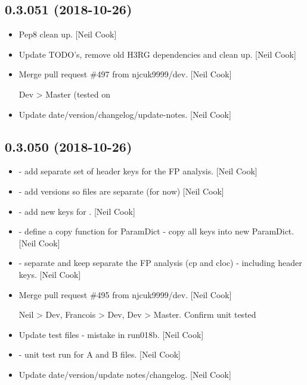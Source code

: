 \documentclass[a4paper,10pt,english]{report}
\begin{document}
\subsection{0.3.051 (2018-10-26)}
\label{\detokenize{misc/changelog:id281}}\begin{itemize}
\item {} 
Pep8 clean up. {[}Neil Cook{]}

\item {} 
Update TODO’s, remove old H3RG dependencies and clean up. {[}Neil Cook{]}

\item {} 
Merge pull request \#497 from njcuk9999/dev. {[}Neil Cook{]}

Dev \textendash{}\textgreater{} Master (tested on 

\item {} 
Update date/version/changelog/update-notes. {[}Neil Cook{]}

\end{itemize}


\subsection{0.3.050 (2018-10-26)}
\label{\detokenize{misc/changelog:id282}}\begin{itemize}
\item {} 
 - add separate set of header keys for the FP
analysis. {[}Neil Cook{]}

\item {} 
 - add  versions so files are separate (for now)
{[}Neil Cook{]}

\item {} 
 - add new keys for . {[}Neil Cook{]}

\item {} 
 - define a copy function for ParamDict - copy all keys
into new ParamDict. {[}Neil Cook{]}

\item {} 
 - separate and keep separate the FP analysis
(cp and cloc) - including header keys. {[}Neil Cook{]}

\item {} 
Merge pull request \#495 from njcuk9999/dev. {[}Neil Cook{]}

Neil \textendash{}\textgreater{} Dev, Francois \textendash{}\textgreater{} Dev, Dev \textendash{}\textgreater{} Master. Confirm unit tested

\item {} 
Update test files - mistake in run018b. {[}Neil Cook{]}

\item {} 
 - unit test run for A and B files. {[}Neil Cook{]}

\item {} 
Update date/version/update notes/changelog. {[}Neil Cook{]}

\end{itemize}
\end{document}
